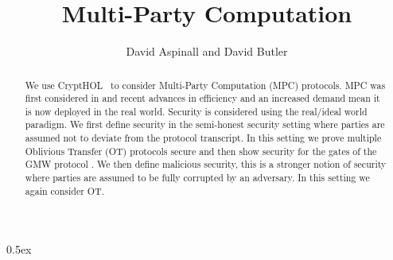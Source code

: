\documentclass[11pt,a4paper]{article}
\begin{document}
\title{Multi-Party Computation}
\author{David Aspinall and David Butler}
\maketitle

\begin{abstract}
We use CryptHOL~\cite{Basin2017, Lochbihler2017AFP} to consider Multi-Party Computation (MPC) protocols. MPC was first considered in \cite{Yao_MPC} and recent advances in efficiency and an increased demand mean it is now deployed in the real world. Security is considered using the real/ideal world paradigm. We first define security in the semi-honest security setting where parties are assumed not to deviate from the protocol transcript. In this setting we prove multiple Oblivious Transfer (OT) protocols secure and then show security for the gates of the GMW protocol \cite{DBLP:conf/stoc/GoldreichMW87}. We then define malicious security, this is a stronger notion of security where parties are assumed to be fully corrupted by an adversary. In this setting we again consider OT.

\end{abstract}


\tableofcontents

\clearpage

\parindent 0pt\parskip 0.5ex





\end{document}
